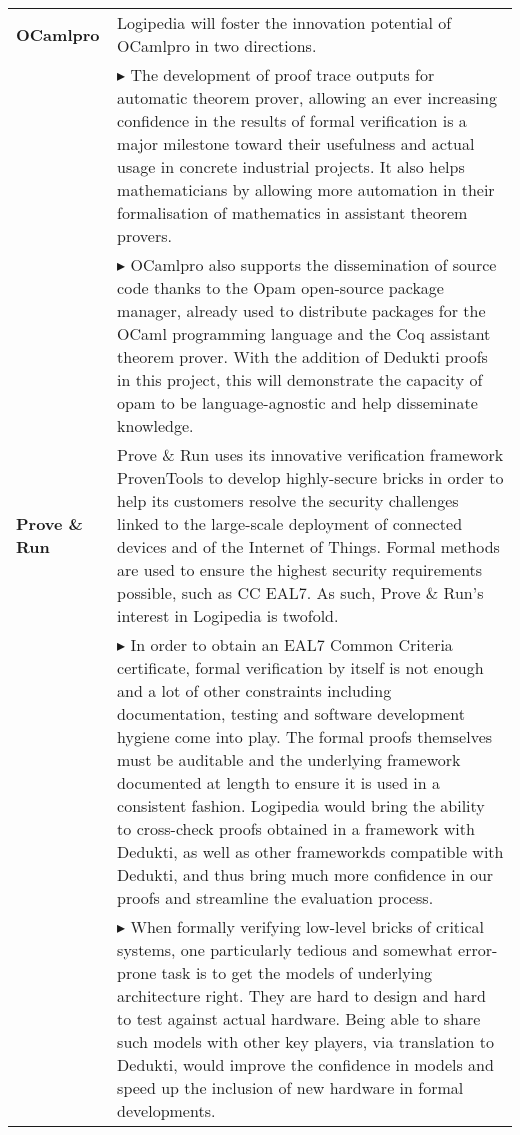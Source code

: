 \begin{longtable*}{|p{0.10\textwidth}|p{0.85\textwidth}|}
\hline

{\bf OCamlpro} &

Logipedia will foster the innovation
potential of OCamlpro in two directions.\\

&
$\blacktriangleright$
The development of proof trace
outputs for automatic theorem prover, allowing an ever increasing
confidence in the results of formal verification is a major milestone
toward their usefulness and actual usage in concrete industrial
projects. It also helps mathematicians by allowing more automation in
their formalisation of mathematics in assistant theorem provers.
\\

&
$\blacktriangleright$
OCamlpro also supports the dissemination of source code thanks to
the Opam open-source package manager, already used to distribute packages
for the OCaml programming language and the Coq assistant theorem prover.
With the addition of Dedukti proofs in this project, this will demonstrate
the capacity of opam to be language-agnostic and help disseminate knowledge.
\\

\hline
{\bf Prove \& Run} &

Prove \& Run uses its innovative verification framework ProvenTools
to develop highly-secure bricks in order to help its customers resolve
the security challenges linked to the large-scale deployment of
connected devices and of the Internet of Things. Formal methods
are used to ensure the highest security requirements possible, such
as CC EAL7. As such, Prove \& Run's interest in Logipedia is
twofold.\\

&
$\blacktriangleright$
In order to obtain an EAL7 Common Criteria certificate, formal
verification by itself is not enough and a lot of other constraints
including documentation, testing and software development hygiene come
into play. The formal proofs themselves must be auditable and the underlying
framework documented at length to ensure it is used in a consistent fashion.
Logipedia would bring the ability to cross-check proofs obtained in a
framework with Dedukti, as well as other frameworkds compatible with
Dedukti, and thus bring much more confidence in our proofs and streamline
the evaluation process.\\

&
$\blacktriangleright$
When formally verifying low-level bricks of critical systems, one
particularly tedious and somewhat error-prone task is to get the models
of underlying architecture right. They are hard to design and hard to
test against actual hardware. Being able to share such models with
other key players, via translation to Dedukti, would improve the confidence
in models and speed up the inclusion of new hardware in formal developments.\\
    

\end{longtable*}
